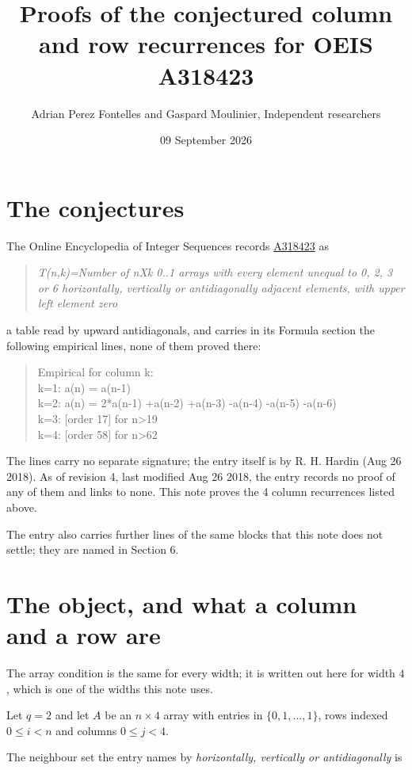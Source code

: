 \documentclass[11pt]{article}
\title{Proofs of the conjectured column and row recurrences for OEIS A318423}
\author{Adrian Perez Fontelles and Gaspard Moulinier, Independent researchers}
\date{09 September 2026}
\theoremstyle{definition}
\begin{document}
\maketitle
\section{The conjectures}

The Online Encyclopedia of Integer Sequences records \href{https://oeis.org/A318423}{A318423} as

\begin{quote}\itshape T(n,k)=Number of nXk 0..1 arrays with every element unequal to 0, 2, 3 or 6 horizontally, vertically or antidiagonally adjacent elements, with upper left element zero\end{quote}

a table read by upward antidiagonals, and carries in its Formula section the following empirical lines, none of them proved there:

\begin{quote}\ttfamily Empirical for column k:\\
k=1: a(n) = a(n-1)\\k=2: a(n) = 2*a(n-1) +a(n-2) +a(n-3) -a(n-4) -a(n-5) -a(n-6)\\k=3: [order 17] for n>19\\k=4: [order 58] for n>62\end{quote}

The lines carry no separate signature; the entry itself is by R. H. Hardin (Aug 26 2018). As of revision 4, last modified Aug 26 2018, the entry records no proof of any of them and links to none. This note proves the 4 column recurrences listed above.

The entry also carries further lines of the same blocks that this note does not settle; they are named in Section 6.

\section{The object, and what a column and a row are}

The array condition is the same for every width; it is written out here for width $4$, which is one of the widths this note uses.

Let $q = 2$ and let $A$ be an $n \times 4$ array with entries in $\{0,1,\dots,1\}$, rows indexed $0 \le i < n$ and columns $0 \le j < 4$.

The neighbour set the entry names by {\itshape horizontally, vertically or antidiagonally} is
\end{document}
